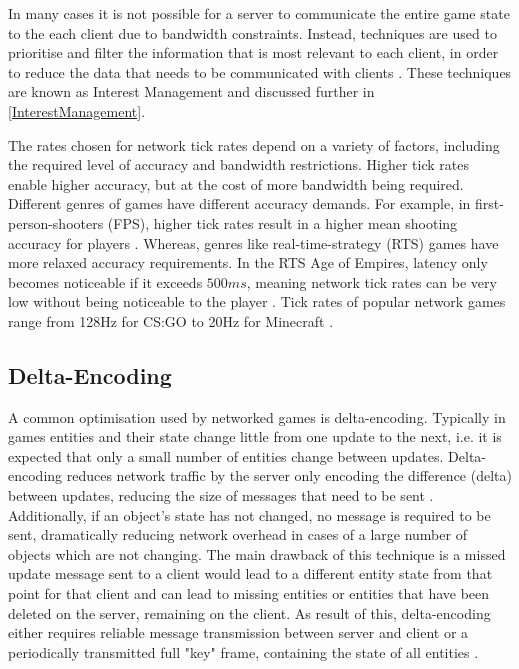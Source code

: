In many cases it is not possible for a server to communicate the entire game state to the each client due to bandwidth constraints. Instead, techniques are used to prioritise and filter the information that is most relevant to each client, in order to reduce the data that needs to be communicated with clients \cite{pisan2004challenges}. These techniques are known as Interest Management and discussed further in \ref{InterestManagement}.

The rates chosen for network tick rates depend on a variety of factors, including the required level of accuracy and bandwidth restrictions. Higher tick rates enable higher accuracy, but at the cost of more bandwidth being required. Different genres of games have different accuracy demands. For example, in first-person-shooters (FPS), higher tick rates result in a higher mean shooting accuracy for players \cite{lee2015evaluation}. Whereas, genres like real-time-strategy (RTS) games have more relaxed accuracy requirements. In the RTS Age of Empires, latency only becomes noticeable if it exceeds $500ms$, meaning network tick rates can be very low without being noticeable to the player \cite{pisan2004challenges}. Tick rates of popular network games range from 128Hz for CS:GO to 20Hz for Minecraft \cite{metzger2016comprehensive}.

\subsection{Delta-Encoding}
A common optimisation used by networked games is delta-encoding. Typically in games entities and their state change little from one update to the next, i.e. it is expected that only a small number of entities change between updates. Delta-encoding reduces network traffic by the server only encoding the difference (delta) between updates, reducing the size of messages that need to be sent \cite{bharambe2006colyseus}. Additionally, if an object's state has not changed, no message is required to be sent, dramatically reducing network overhead in cases of a large number of objects which are not changing. The main drawback of this technique is a missed update message sent to a client would lead to a different entity state from that point for that client and can lead to missing entities or entities that have been deleted on the server, remaining on the client. As result of this, delta-encoding either requires reliable message transmission between server and client or a periodically transmitted full "key" frame, containing the state of all entities \cite{bharambe2004supporting}.

